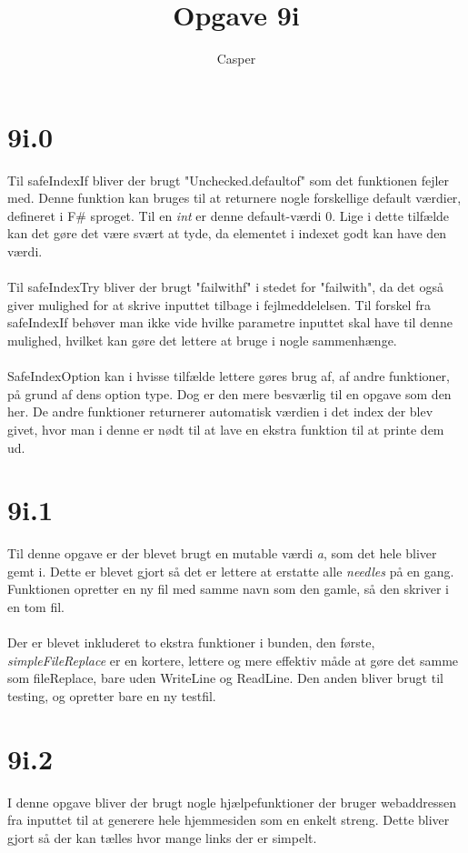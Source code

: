 \documentclass[12pt,a4paper]{article}
\title{Opgave 9i}
\author{Casper}
\begin{document}
\maketitle

\section*{9i.0}
Til safeIndexIf bliver der brugt "Unchecked.defaultof" som det funktionen fejler med. Denne funktion kan bruges til at returnere nogle forskellige default værdier, defineret i F\# sproget. Til en \textit{int} er denne default-værdi $0$. Lige i dette tilfælde kan det gøre det være svært at tyde, da elementet i indexet godt kan have den værdi.\\\\
Til safeIndexTry bliver der brugt "failwithf" i stedet for "failwith", da det også giver mulighed for at skrive inputtet tilbage i fejlmeddelelsen. Til forskel fra safeIndexIf behøver man ikke vide hvilke parametre inputtet skal have til denne mulighed, hvilket kan gøre det lettere at bruge i nogle sammenhænge.\\\\
SafeIndexOption kan i hvisse tilfælde lettere gøres brug af, af andre funktioner, på grund af dens option type. Dog er den mere besværlig til en opgave som den her. De andre funktioner returnerer automatisk værdien i det index der blev givet, hvor man i denne er nødt til at lave en ekstra funktion til at printe dem ud.

\section*{9i.1}
Til denne opgave er der blevet brugt en mutable værdi \textit{a}, som det hele bliver gemt i. Dette er blevet gjort så det er lettere at erstatte alle \textit{needles} på en gang. Funktionen opretter en ny fil med samme navn som den gamle, så den skriver i en tom fil. \\\\
Der er blevet inkluderet to ekstra funktioner i bunden, den første, \textit{simpleFileReplace} er en kortere, lettere og mere effektiv måde at gøre det samme som fileReplace, bare uden WriteLine og ReadLine. Den anden bliver brugt til testing, og opretter bare en ny testfil.

\section*{9i.2}
I denne opgave bliver der brugt nogle hjælpefunktioner der bruger webaddressen fra inputtet til at generere hele hjemmesiden som en enkelt streng. Dette bliver gjort så der kan tælles hvor mange links der er simpelt.
\end{document}
